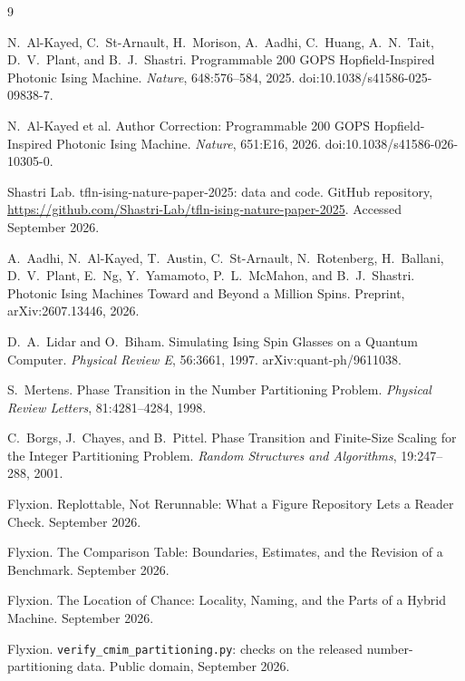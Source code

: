 \documentclass[11pt]{article}
\theoremstyle{definition}
\theoremstyle{remark}
\begin{document}
\begin{thebibliography}{9}

N.~Al-Kayed, C.~St-Arnault, H.~Morison, A.~Aadhi, C.~Huang, A.~N.~Tait, D.~V.~Plant, and B.~J.~Shastri.
Programmable 200 GOPS Hopfield-Inspired Photonic Ising Machine.
\emph{Nature}, 648:576--584, 2025. doi:10.1038/s41586-025-09838-7.

N.~Al-Kayed et al.
Author Correction: Programmable 200 GOPS Hopfield-Inspired Photonic Ising Machine.
\emph{Nature}, 651:E16, 2026. doi:10.1038/s41586-026-10305-0.

Shastri Lab.
tfln-ising-nature-paper-2025: data and code.
GitHub repository, \url{https://github.com/Shastri-Lab/tfln-ising-nature-paper-2025}. Accessed September 2026.

A.~Aadhi, N.~Al-Kayed, T.~Austin, C.~St-Arnault, N.~Rotenberg, H.~Ballani, D.~V.~Plant, E.~Ng, Y.~Yamamoto, P.~L.~McMahon, and B.~J.~Shastri.
Photonic Ising Machines Toward and Beyond a Million Spins.
Preprint, arXiv:2607.13446, 2026.

D.~A.~Lidar and O.~Biham.
Simulating Ising Spin Glasses on a Quantum Computer.
\emph{Physical Review E}, 56:3661, 1997. arXiv:quant-ph/9611038.

S.~Mertens.
Phase Transition in the Number Partitioning Problem.
\emph{Physical Review Letters}, 81:4281--4284, 1998.

C.~Borgs, J.~Chayes, and B.~Pittel.
Phase Transition and Finite-Size Scaling for the Integer Partitioning Problem.
\emph{Random Structures and Algorithms}, 19:247--288, 2001.

Flyxion.
Replottable, Not Rerunnable: What a Figure Repository Lets a Reader Check.
September 2026.

Flyxion.
The Comparison Table: Boundaries, Estimates, and the Revision of a Benchmark.
September 2026.

Flyxion.
The Location of Chance: Locality, Naming, and the Parts of a Hybrid Machine.
September 2026.

Flyxion.
\texttt{verify\_cmim\_partitioning.py}: checks on the released number-partitioning data.
Public domain, September 2026.

\end{thebibliography}
\end{document}
